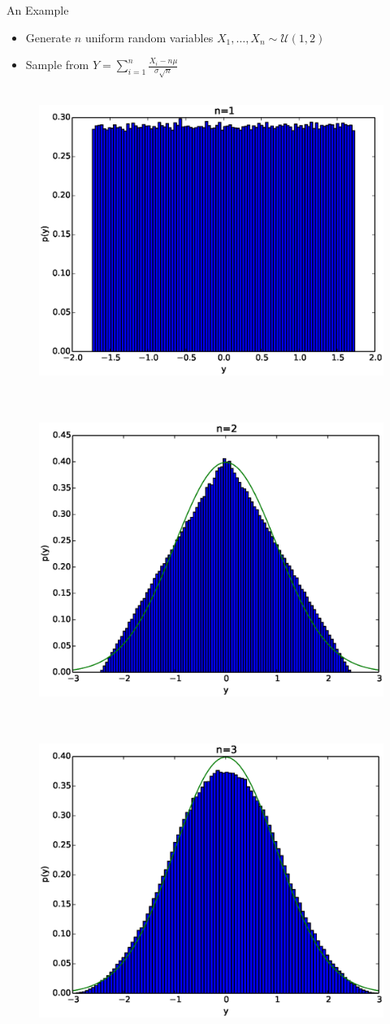 \documentclass{beamer}
\begin{document}
\begin{frame}{An Example}  
\begin{itemize} 
 \item Generate $n$ uniform random variables $X_1, \ldots, X_n \sim \mathcal{U}(1, 2)$ 
\item Sample from $Y = \sum_{i=1}^n \frac{X_i - n\mu}{\sigma \sqrt{n}}$ 
\end{itemize}
 \begin{figure}[htp]
\mbox{
\includegraphics[width=0.5\linewidth]{clt0.eps}
}
\end{figure} 
\end{frame}

\begin{frame} 
  \begin{figure}[htp]
\mbox{
\includegraphics[width=0.5\linewidth]{clt1.eps}
}
\end{figure} 
\end{frame}

\begin{frame} 
  \begin{figure}[htp]
\mbox{
\includegraphics[width=0.5\linewidth]{clt2.eps}
}
\end{figure} 
\end{frame}
\end{document}
